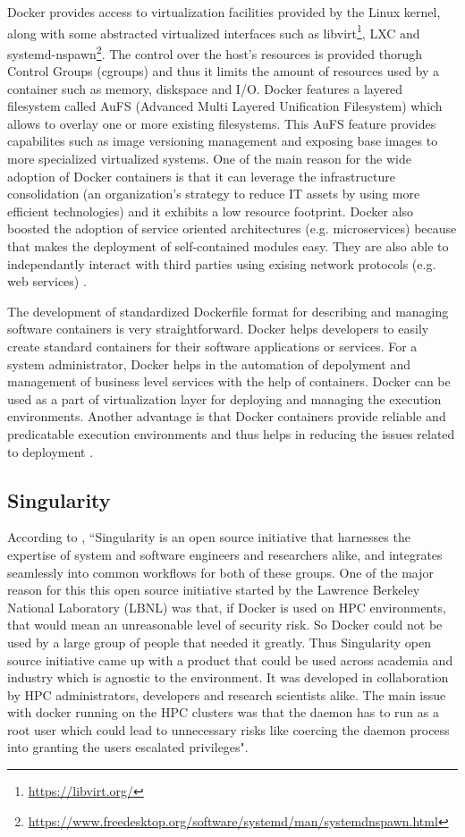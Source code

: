 Docker provides access to virtualization facilities provided by the Linux kernel, along with some abstracted virtualized interfaces such as libvirt\footnote{\url{https://libvirt.org/}}, LXC and systemd-nspawn\footnote{\url{https://www.freedesktop.org/software/systemd/man/systemdnspawn.html}}. The control over the host's resources is provided thorugh Control Groups (cgroups) and thus it limits the amount of resources used by a container such as memory, diskspace and I/O. Docker features a layered filesystem called AuFS (Advanced Multi Layered Unification Filesystem) which allows to overlay one or more existing filesystems. This AuFS feature provides capabilites such as image versioning management and exposing base images to more specialized virtualized systems. One of the main reason for the wide adoption of Docker containers is that it can leverage the infrastructure consolidation (an organization's strategy to reduce IT assets by using more efficient technologies) and it exhibits a low resource footprint. Docker also boosted the adoption of service oriented architectures (e.g. microservices) because that makes the deployment of self-contained modules easy. They are also able to independantly interact with third parties using exising network protocols (e.g. web services) \cite{Xavier:2013:PEC:2497369.2497577}. 

The development of standardized Dockerfile format for describing and managing software containers is very straightforward. Docker helps developers to easily create standard containers for their software applications or services. For a system administrator, Docker helps in the automation of depolyment and management of business level services with the help of containers. Docker can be used as a part of virtualization layer for deploying and managing the execution environments. Another advantage is that Docker containers provide reliable and predicatable execution environments and thus helps in reducing the issues related to deployment \cite{DBLP:journals/corr/MorrisVHM17}.

\subsection{Singularity}
According to \cite{10.1371/journal.pone.0177459}, ``Singularity is an open source initiative that harnesses the expertise of system and software engineers and researchers alike, and integrates seamlessly into common workflows for both of these groups. One of the major reason for this this open source initiative started by the Lawrence Berkeley National Laboratory (LBNL) was that, if Docker is used on HPC environments, that would mean an unreasonable level of security risk. So Docker could not be used by a large group of people that needed it greatly. Thus Singularity open source initiative came up with a product that could be used across academia and industry which is agnostic to the environment. It was developed in collaboration by HPC administrators, developers and research scientists alike. The main issue with docker running on the HPC clusters was that the daemon has to run as a root user which could lead to unnecessary risks like coercing the daemon process into granting the users escalated privileges".

